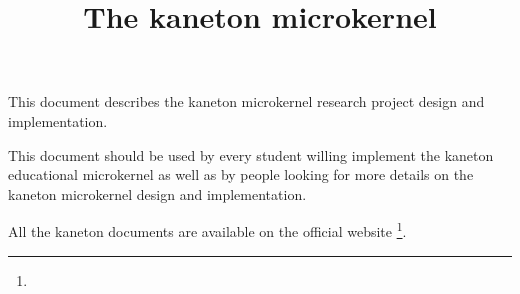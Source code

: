 %
%
%
%
%
%

%
%

%
%

\def\path{../..}

%
%



%
%


%
%

\title{The kaneton microkernel \\
       \version
       \logo}

%
%



%
%

\maketitle

%
%

This document describes the kaneton microkernel research project design
and implementation.

\-

This document should be used by every student willing implement the
kaneton educational microkernel as well as by people looking for more
details on the kaneton microkernel design and implementation.

\-

All the kaneton documents are available on
the official website
  \footnote{}.

%
%

\tableofcontents

%
%

\indentation{}

%
%











